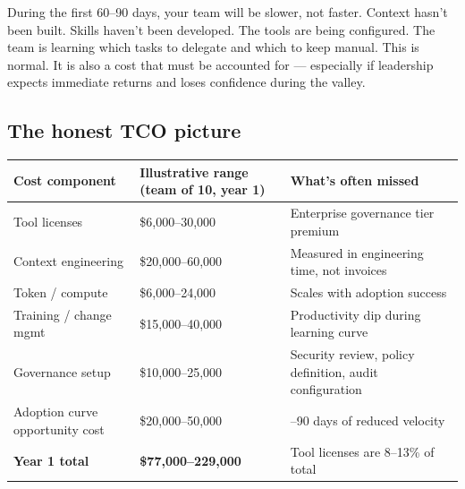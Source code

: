 \documentclass[
  a4paper,
  DIV=11,
  numbers=noendperiod]{scrreprt}
\newcounter{none} %
\begin{document}
During the first 60--90 days, your team will be slower, not faster.
Context hasn't been built. Skills haven't been developed. The tools are
being configured. The team is learning which tasks to delegate and which
to keep manual. This is normal. It is also a cost that must be accounted
for --- especially if leadership expects immediate returns and loses
confidence during the valley.

\subsection{The honest TCO picture}\label{the-honest-tco-picture}

{\def\LTcaptype{none} %
\begin{longtable}[]{@{}
  >{\raggedright\arraybackslash}p{}
  >{\raggedright\arraybackslash}p{}
  >{\raggedright\arraybackslash}p{}@{}}
\toprule\noalign{}
\begin{minipage}[b]{\linewidth}\raggedright
Cost component
\end{minipage} & \begin{minipage}[b]{\linewidth}\raggedright
Illustrative range (team of 10, year 1)
\end{minipage} & \begin{minipage}[b]{\linewidth}\raggedright
What's often missed
\end{minipage} \\
\midrule\noalign{}
\endhead
\bottomrule\noalign{}
\endlastfoot
Tool licenses & \$6,000--30,000 & Enterprise governance tier premium \\
Context engineering & \$20,000--60,000 & Measured in engineering time,
not invoices \\
Token / compute & \$6,000--24,000 & Scales with adoption success \\
Training / change mgmt & \$15,000--40,000 & Productivity dip during
learning curve \\
Governance setup & \$10,000--25,000 & Security review, policy
definition, audit configuration \\
Adoption curve opportunity cost & \$20,000--50,000 & 60--90 days of
reduced velocity \\
\textbf{Year 1 total} & \textbf{\$77,000--229,000} & Tool licenses are
8--13\% of total \\
\end{longtable}
}
\end{document}
